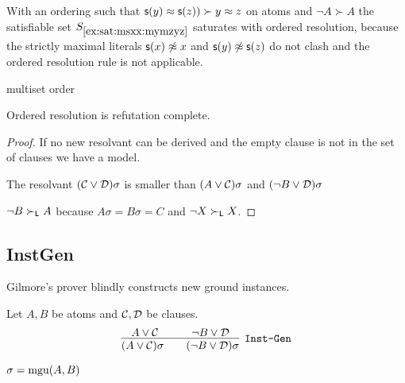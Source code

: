 \begin{example}
	With an ordering such that ${\mathsf s}(y)\approx{\mathsf s}(z)) \succ y\approx z$ on atoms and ${\lnot A} \succ A$
	the satisfiable set $S_{\ref{ex:sat:msxx:mymzyz}}$ saturates with ordered resolution,
	because the strictly maximal literals 
	${\mathsf s}(x)\not\approx x$ and
	${\mathsf s}(y)\not\approx{\mathsf s}(z)$
	do not clash and the ordered resolution rule is not applicable.
\end{example}


\begin{definition}
	multiset order
\end{definition}

\begin{lemma}
	Ordered resolution is refutation complete.
\end{lemma}

\begin{proof}
	If no new resolvant can be derived and the empty clause is not in the set of clauses we have a model.
	
	The resolvant $({\mathcal C}\lor{\mathcal D})\sigma$ is smaller than $(A\lor{\mathcal C})\sigma$ and $(\lnot B\lor{\mathcal D})\sigma$
	
	$\lnot B \succ_{\mathsf L} A$ because $A\sigma=B\sigma=C$ and $\lnot X\succ_{\mathsf L} X$.
\end{proof}








\subsection{InstGen}\label{sec:inst:gen}

Gilmore's prover blindly constructs new ground instances. 

\begin{definition}[\InstGen] Let $A, B$ be atoms and ${\mathcal C},{\mathcal D}$ be clauses.
	\begin{gather*}
	\infer
	[{\InstGen}] 
	{(A\lor\mathcal C)\sigma\qquad (\lnot B\lor\mathcal D)\sigma}
	{A\lor\mathcal C\quad&\quad \lnot B\lor\mathcal D}
	\end{gather*}
	\begin{center}$\sigma=\operatorname{mgu}(A,B)$
	\end{center}
\end{definition}

